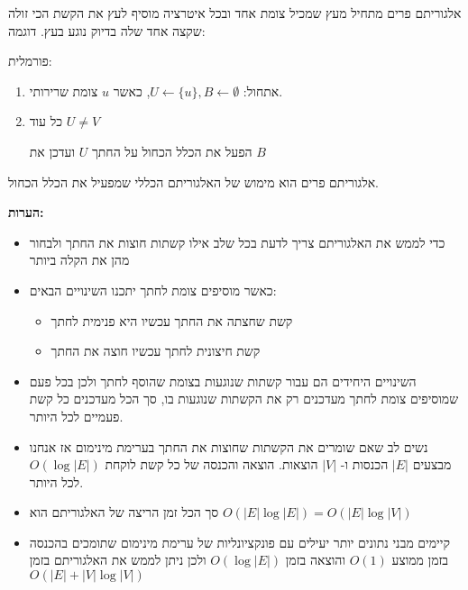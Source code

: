 אלגוריתם פרים מתחיל מעץ שמכיל צומת אחד ובכל איטרציה מוסיף לעץ את הקשת הכי זולה שקצה
אחד שלה בדיוק נוגע בעץ.
דוגמה:

\begin{center}
\end{center}

\newpage
פורמלית:
\begin{enumerate}
\item
אתחול:
$U \leftarrow \{u\}, B \leftarrow \emptyset$, 
כאשר $u$ צומת שרירותי.
\item
כל עוד 
$U \neq V$
\begin{enumerate}
הפעל את הכלל הכחול על החתך $U$ ועדכן את $B$
\end{enumerate}
\end{enumerate}
\begin{observation}
אלגוריתם פרים הוא מימוש של האלגוריתם הכללי שמפעיל את הכלל הכחול.
\end{observation}

\textbf{הערות:}
\begin{itemize}
\item
כדי לממש את האלגוריתם צריך לדעת בכל שלב אילו קשתות חוצות את החתך ולבחור מהן את הקלה ביותר
\item
כאשר מוסיפים צומת לחתך יתכנו השינויים הבאים:
\begin{itemize}
\item
קשת שחצתה את החתך עכשיו היא פנימית לחתך
\item
קשת חיצונית לחתך עכשיו חוצה את החתך
\end{itemize}
\item
השינויים היחידים הם עבור קשתות שנוגעות בצומת שהוסף לחתך ולכן בכל פעם שמוסיפים צומת לחתך 
מעדכנים רק את הקשתות שנוגעות בו, סך הכל מעדכנים כל קשת פעמיים לכל היותר.
\item
נשים לב שאם שומרים את הקשתות שחוצות את החתך בערימת מינימום אז 
אנחנו מבצעים 
$|E|$
הכנסות ו-%
$|V|$
הוצאות.
הוצאה והכנסה של כל קשת לוקחת
$O(\log |E|)$
לכל היותר. 
\item
סך הכל זמן הריצה של האלגוריתם הוא
$O(|E|\log|E|) = O(|E|\log|V|)$
\item
קיימים מבני נתונים יותר יעילים עם פונקציונליות של ערימת מינימום 
שתומכים בהכנסה בזמן ממוצע
$O(1)$
והוצאה בזמן 
$O(\log |E|)$
ולכן ניתן לממש את האלגוריתם בזמן 
$O(|E| + |V|\log |V|)$
\end{itemize}
